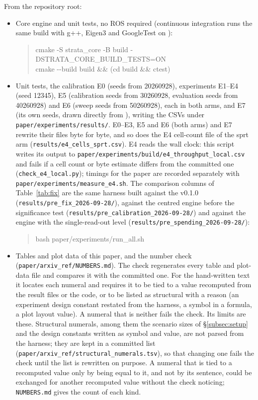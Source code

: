 \noindent From the repository root:
\begin{itemize}
  \item Core engine and unit tests, no ROS required (continuous integration runs the same build with g++, Eigen3 and GoogleTest on ):
\begin{quote}\small\ttfamily
cmake -S strata\_core -B build -DSTRATA\_CORE\_BUILD\_TESTS=ON\\
cmake -{}-build build \&\& (cd build \&\& ctest)
\end{quote}
  \item Unit tests, the calibration E0 (seeds from 20260928), experiments E1--E4 (seed 12345), E5 (calibration seeds from 30260928, evaluation seeds from 40260928) and E6 (sweep seeds from 50260928), each in both arms, and E7 (its own seeds, drawn directly from ), writing the CSVs under \nolinkurl{paper/experiments/results/}. E0--E3, E5 and E6 (both arms) and E7 rewrite their files byte for byte, and so does the E4 cell-count file of the sprt arm (\nolinkurl{results/e4_cells_sprt.csv}). E4 reads the wall clock: this script writes its output to \nolinkurl{paper/experiments/build/e4_throughput_local.csv} and fails if a cell count or byte estimate differs from the committed one (\nolinkurl{check_e4_local.py}); timings for the paper are recorded separately with \nolinkurl{paper/experiments/measure_e4.sh}. The comparison columns of Table~\ref{tab:fix} are the same harness built against the v0.1.0  (\nolinkurl{results/pre_fix_2026-09-28/}), against the centred engine before the significance test (\nolinkurl{results/pre_calibration_2026-09-28/}) and against the engine with the single-read-out level (\nolinkurl{results/pre_spending_2026-09-28/}):
\begin{quote}\small\ttfamily bash paper/experiments/run\_all.sh\end{quote}
  \item Tables and plot data of this paper, and the number check (\nolinkurl{paper/arxiv_ref/NUMBERS.md}). The check regenerates every table and plot-data file and compares it with the committed one. For the hand-written text it locates each numeral and requires it to be tied to a value recomputed from the result files or the code, or to be listed as structural with a reason (an experiment design constant restated from the harness, a symbol in a formula, a plot layout value). A numeral that is neither fails the check. Its limits are these. Structural numerals, among them the scenario sizes of \S\ref{subsec:setup} and the design constants written as symbol and value, are not parsed from the harness; they are kept in a committed list (\nolinkurl{paper/arxiv_ref/structural_numerals.tsv}), so that changing one fails the check until the list is rewritten on purpose. A numeral that is tied to a recomputed value only by being equal to it, and not by its sentence, could be exchanged for another recomputed value without the check noticing; \nolinkurl{NUMBERS.md} gives the count of each kind.

\end{itemize}
